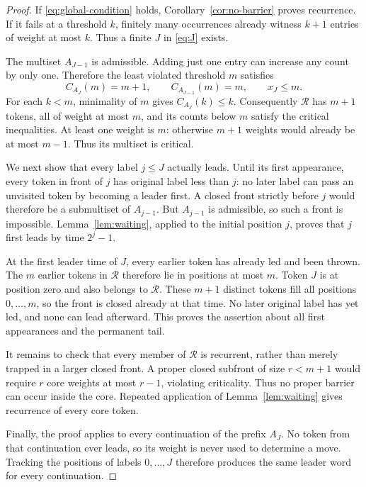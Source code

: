 \documentclass[11pt,letterpaper]{article}
\theoremstyle{definition}
\newcommand{\core}{\mathcal R}
\begin{document}
\begin{proof}
If \eqref{eq:global-condition} holds, Corollary~\ref{cor:no-barrier} proves
recurrence. If it fails at a threshold $k$, finitely many occurrences already
witness $k+1$ entries of weight at most $k$. Thus a finite $J$ in
\eqref{eq:J} exists.

The multiset $A_{J-1}$ is admissible. Adding just one entry can increase any
count by only one. Therefore the least violated threshold $m$ satisfies
\[
 C_{A_J}(m)=m+1,\qquad C_{A_{J-1}}(m)=m,\qquad x_J\le m.
\]
For each $k<m$, minimality of $m$ gives $C_{A_J}(k)\le k$. Consequently
$\core$ has $m+1$ tokens, all of weight at most $m$, and its counts below
$m$ satisfy the critical inequalities. At least one weight is $m$:
otherwise $m+1$ weights would already be at most $m-1$. Thus its multiset
is critical.

We next show that every label $j\le J$ actually leads. Until its first
appearance, every token in front of $j$ has original label less than $j$:
no later label can pass an unvisited token by becoming a leader first.
A closed front strictly before $j$ would therefore be a submultiset of
$A_{j-1}$. But $A_{j-1}$ is admissible, so such a front is impossible.
Lemma~\ref{lem:waiting}, applied to the initial position $j$, proves that
$j$ first leads by time $2^j-1$.

At the first leader time of $J$, every earlier token has already led and
been thrown. The $m$ earlier tokens in $\core$ therefore lie in positions
at most $m$. Token $J$ is at position zero and also belongs to $\core$.
These $m+1$ distinct tokens fill all positions $0,\ldots,m$, so the front
is closed already at that time. No later original label has yet led, and
none can lead afterward. This proves the assertion about all first appearances
and the permanent tail.

It remains to check that every member of $\core$ is recurrent, rather than
merely trapped in a larger closed front. A proper closed subfront of size
$r<m+1$ would require $r$ core weights at most $r-1$, violating criticality.
Thus no proper barrier can occur inside the core. Repeated application of
Lemma~\ref{lem:waiting} gives recurrence of every core token.

Finally, the proof applies to every continuation of the prefix $A_J$.
No token from that continuation ever leads, so its weight is never used to
determine a move. Tracking the positions of labels $0,\ldots,J$ therefore
produces the same leader word for every continuation.
\end{proof}
\end{document}
